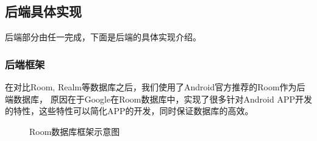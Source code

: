 \documentclass[UTF8]{article}
\begin{document}
\clearpage

\subsection{后端具体实现}
后端部分由任一完成，下面是后端的具体实现介绍。
\subsubsection{后端框架}
在对比Room, Realm等数据库之后，我们使用了Android官方推荐的Room作为后端数据库，
原因在于Google在Room数据库中，实现了很多针对Android APP开发的特性，这些特性可以简化APP的开发，同时保证数据库的高效。

\begin{figure}[htbp]
    \centering
    \label{arch}
    \centering
    \caption{Room数据库框架示意图}
    \end{figure}
\end{document}
